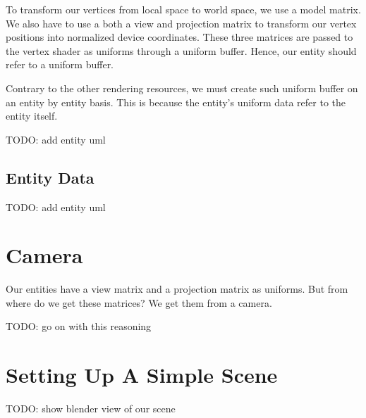To transform our vertices from local space to world space, we use a model matrix.
We also have to use a both a view and projection matrix to transform our vertex
positions into normalized device coordinates.
These three matrices are passed to the vertex shader as uniforms through a
uniform buffer.
Hence, our entity should refer to a uniform buffer.

Contrary to the other rendering resources, we must create such uniform
buffer on an entity by entity basis.
This is because the entity's uniform data refer to the entity itself.

TODO: add entity uml

\subsection{Entity Data}

TODO: add entity uml

\section{Camera}

Our entities have a view matrix and a projection matrix as uniforms.
But from where do we get these matrices?
We get them from a camera.

TODO: go on with this reasoning

\section{Setting Up A Simple Scene}

TODO: show blender view of our scene
